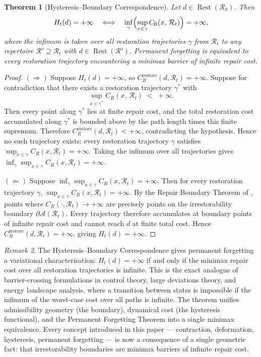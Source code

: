 \documentclass[12pt, oneside]{article}
\theoremstyle{plain}
\newtheorem{theorem}{Theorem}[section]
\theoremstyle{definition}
\theoremstyle{remark}
\newtheorem{remark}[theorem]{Remark}
\DeclareMathOperator{\Rest}{Rest}
\newcommand{\CR}{C_{\!R}}
\newcommand{\AO}{\mathcal{A}}
\newcommand{\Rt}{\mathcal{R}_t}
\newcommand{\Rzero}{\mathcal{R}_0}
\newcommand{\Restzero}{\Rest(\Rzero)}
\newcommand{\Hyster}{H}
\begin{document}
\begin{theorem}[Hysteresis--Boundary Correspondence]
  Let $d \in \Restzero$.
  Then
  \[
    \Hyster_t(d) = +\infty
    \quad\Longleftrightarrow\quad
    \inf_{\gamma}
    \Bigl(
      \sup_{x \in \gamma} \CR(x,\, \Rt)
    \Bigr)
    = +\infty,
  \]
  where the infimum is taken over all restoration trajectories
  $\gamma$ from $\Rt$ to any repertoire $\mathcal{R}' \supseteq \Rt$
  with $d \in \Rest(\mathcal{R}')$.
  Permanent forgetting is equivalent to every restoration trajectory
  encountering a minimax barrier of infinite repair cost.
  \label{thm:hysteresis-boundary}
\end{theorem}

\begin{proof}
  $(\Rightarrow)$\;
  Suppose $\Hyster_t(d) = +\infty$, so
  $\CR^{\mathrm{restore}}(d, \Rt) = +\infty$.
  Suppose for contradiction that there exists a restoration
  trajectory $\gamma^*$ with
  \[
    \sup_{x \in \gamma^*} \CR(x,\, \Rt) \;<\; +\infty.
  \]
  Then every point along $\gamma^*$ lies at finite repair cost, and
  the total restoration cost accumulated along $\gamma^*$ is bounded
  above by the path length times this finite supremum.
  Therefore $\CR^{\mathrm{restore}}(d, \Rt) < +\infty$, contradicting
  the hypothesis.
  Hence no such trajectory exists: every restoration trajectory
  $\gamma$ satisfies $\sup_{x \in \gamma} \CR(x, \Rt) = +\infty$.
  Taking the infimum over all trajectories gives
  $\inf_\gamma \sup_{x \in \gamma} \CR(x, \Rt) = +\infty$.

  $(\Leftarrow)$\;
  Suppose $\inf_\gamma \sup_{x \in \gamma} \CR(x, \Rt) = +\infty$.
  Then for every restoration trajectory $\gamma$,
  $\sup_{x \in \gamma} \CR(x, \Rt) = +\infty$.
  By the Repair Boundary Theorem of \cite{Flyxion2026a}, points
  where $\CR(\cdot, \Rt) \to +\infty$ are precisely points on the
  irrestorability boundary $\partial\AO(\Rt)$.
  Every trajectory therefore accumulates at boundary points of
  infinite repair cost and cannot reach $d$ at finite total cost.
  Hence $\CR^{\mathrm{restore}}(d, \Rt) = +\infty$, giving
  $\Hyster_t(d) = +\infty$.
\end{proof}

\begin{remark}
  The Hysteresis--Boundary Correspondence gives permanent forgetting
  a variational characterisation: $\Hyster_t(d) = +\infty$ if and
  only if the minimax repair cost over all restoration trajectories
  is infinite.
  This is the exact analogue of barrier-crossing formulations in
  control theory, large deviations theory, and energy landscape
  analysis, where a transition between states is impossible if the
  infimum of the worst-case cost over all paths is infinite.
  The theorem unifies admissibility geometry (the boundary),
  dynamical cost (the hysteresis functional), and the Permanent
  Forgetting Theorem into a single minimax equivalence.
  Every concept introduced in this paper --- contraction,
  deformation, hysteresis, permanent forgetting --- is now
  a consequence of a single geometric fact: that irrestorability
  boundaries are minimax barriers of infinite repair cost.
\end{remark}
\end{document}

